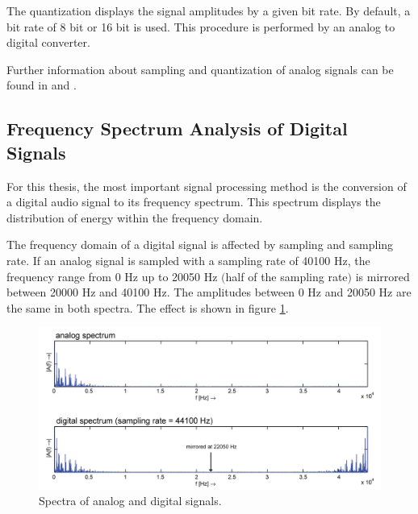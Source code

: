 The quantization displays the signal amplitudes by a given bit rate. By default, a bit rate of 8 bit or 16 bit is used. This procedure is performed by an analog to digital converter. 

Further information about sampling and quantization of analog signals can be found in \autocite{Werner:2012} and \autocite{Zoelzer:2008}.

\subsection{Frequency Spectrum Analysis of Digital Signals} 
For this thesis, the most important signal processing method is the conversion of a digital audio signal to its frequency spectrum. This spectrum displays the distribution of energy within the frequency domain. 

The frequency domain of a digital signal is affected by sampling and sampling rate. If an analog signal is sampled with a sampling rate of 40100 Hz, the frequency range from 0 Hz up to 20050 Hz $($half of the sampling rate$)$ is mirrored between 20000 Hz and 40100 Hz. The amplitudes between 0 Hz and 20050 Hz are the same in both spectra. The effect is shown in figure \ref{fig:analogDigitalSpectra}. 


\begin{figure}[h]
	\centering
	\includegraphics{images/analogDigitalSpectra.png}
	\caption{ Spectra of analog and digital signals.}
	\label{fig:analogDigitalSpectra}
\end{figure}


